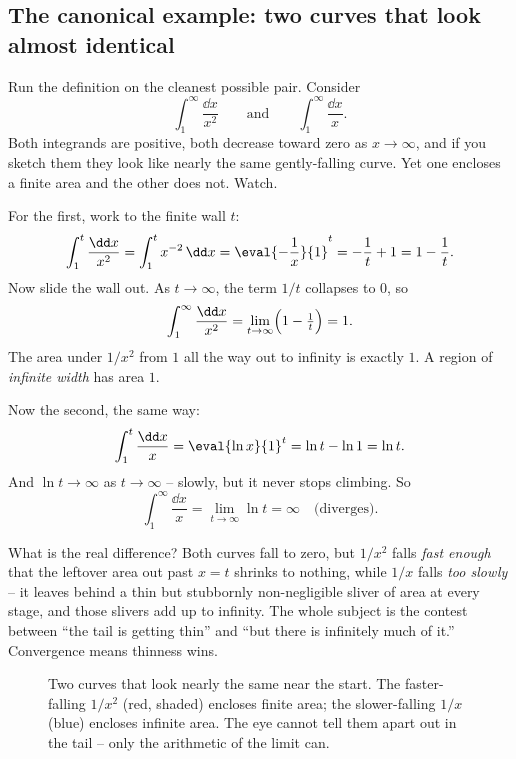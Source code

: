 \subsection{The canonical example: two curves that look almost identical}
\label{ch25:canonical}

Run the definition on the cleanest possible pair. Consider
\[
  \int_1^{\infty} \frac{\dd x}{x^2}
  \qquad\text{and}\qquad
  \int_1^{\infty} \frac{\dd x}{x}.
\]
Both integrands are positive, both decrease toward zero as $x\to\infty$, and if
you sketch them they look like nearly the same gently-falling curve. Yet one
encloses a finite area and the other does not. Watch.

For the first, work to the finite wall $t$:
\[
  \int_1^{t} \frac{\dd x}{x^2}
  = \int_1^{t} x^{-2}\,\dd x
  = \eval{-\frac{1}{x}}{1}^{t}
  = -\frac{1}{t} + 1
  = 1 - \frac{1}{t}.
\]
Now slide the wall out. As $t\to\infty$, the term $1/t$ collapses to $0$, so
\[
  \int_1^{\infty} \frac{\dd x}{x^2}
  = \lim_{t\to\infty}\Bigl(1 - \tfrac{1}{t}\Bigr) = 1.
\]
The area under $1/x^2$ from $1$ all the way out to infinity is exactly $1$.
A region of \emph{infinite width} has area $1$.

Now the second, the same way:
\[
  \int_1^{t} \frac{\dd x}{x}
  = \eval{\ln x}{1}^{t}
  = \ln t - \ln 1 = \ln t.
\]
And $\ln t \to \infty$ as $t\to\infty$ -- slowly, but it never stops climbing. So
\[
  \int_1^{\infty} \frac{\dd x}{x} = \lim_{t\to\infty} \ln t = \infty
  \quad\text{(diverges).}
\]

\begin{intuitionbox}
What is the real difference? Both curves fall to zero, but $1/x^2$ falls
\emph{fast enough} that the leftover area out past $x=t$ shrinks to nothing,
while $1/x$ falls \emph{too slowly} -- it leaves behind a thin but stubbornly
non-negligible sliver of area at every stage, and those slivers add up to
infinity. The whole subject is the contest between ``the tail is getting thin''
and ``but there is infinitely much of it.'' Convergence means thinness wins.
\end{intuitionbox}

\begin{figure}[H]
\centering
{}
\caption{Two curves that look nearly the same near the start. The faster-falling
$1/x^2$ (red, shaded) encloses finite area; the slower-falling $1/x$ (blue)
encloses infinite area. The eye cannot tell them apart out in the tail -- only the
arithmetic of the limit can.}
\label{ch25:fig-x-vs-x2}
\end{figure}


